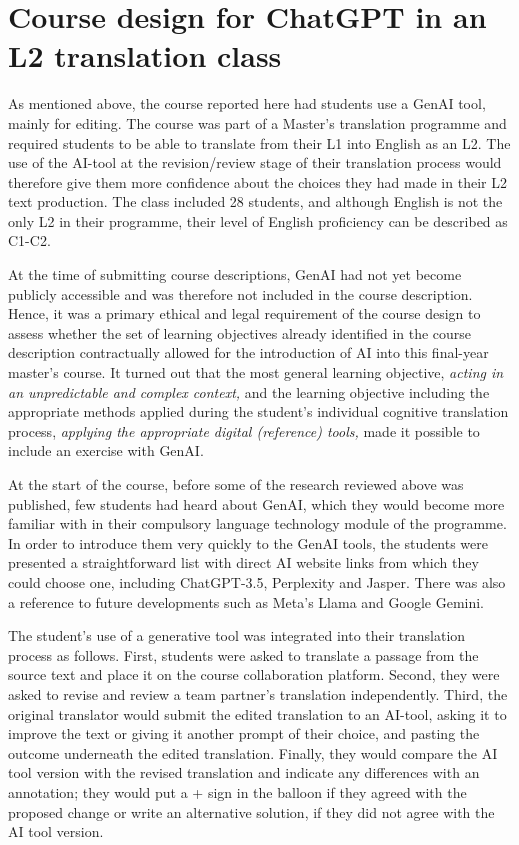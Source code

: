 \documentclass[output=paper]{langscibook}
\begin{document}
\section{Course design for ChatGPT in an L2 translation class}

As mentioned above, the course reported here had students use a GenAI tool, mainly for editing. The course was part of a Master’s translation programme and required students to be able to translate from their L1 into English as an L2. The use of the AI-tool at the revision/review stage of their translation process would therefore give them more confidence about the choices they had made in their L2 text production. The class included 28 students, and although English is not the only L2 in their programme, their level of English proficiency can be described as C1-C2.

At the time of submitting course descriptions, GenAI had not yet become publicly accessible and was therefore not included in the course description. Hence, it was a primary ethical and legal requirement of the course design to assess whether the set of learning objectives already identified in the course description contractually allowed for the introduction of AI into this final-year master’s course. It turned out that the most general learning objective, \textit{acting in an unpredictable and complex context,} and the learning objective including the appropriate methods applied during the student’s individual cognitive translation process, \textit{applying the appropriate digital (reference) tools,} made it possible to include an exercise with GenAI. 

At the start of the course, before some of the research reviewed above was published, few students had heard about GenAI, which they would become more familiar with in their compulsory language technology module of the programme. In order to introduce them very quickly to the GenAI tools, the students were presented a straightforward list with direct AI website links from which they could choose one, including ChatGPT-3.5, Perplexity and Jasper. There was also a reference to future developments such as Meta's Llama and Google Gemini. 

The student’s use of a generative tool was integrated into their translation process as follows. First, students were asked to translate a passage from the source text and place it on the course collaboration platform. Second, they were asked to revise and review a team partner’s translation independently. Third, the original translator would submit the edited translation to an AI-tool, asking it to improve the text or giving it another prompt of their choice, and pasting the outcome underneath the edited translation. Finally, they would compare the AI tool version with the revised translation and indicate any differences with an annotation; they would put a + sign in the balloon if they agreed with the proposed change or write an alternative solution, if they did not agree with the AI tool version.
\end{document}
